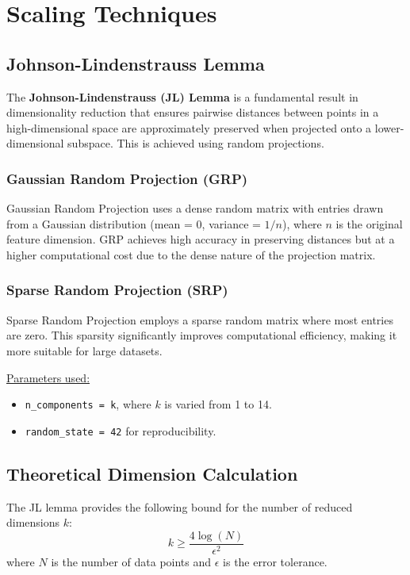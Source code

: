 \documentclass[conference]{IEEEtran}
\begin{document}
\section{Scaling Techniques}

\subsection{Johnson-Lindenstrauss Lemma}
The \textbf{Johnson-Lindenstrauss (JL) Lemma} is a fundamental result in dimensionality reduction that ensures pairwise distances between points in a high-dimensional space are approximately preserved when projected onto a lower-dimensional subspace. This is achieved using random projections.

\subsubsection{\textbf{Gaussian Random Projection (GRP)}}
Gaussian Random Projection uses a dense random matrix with entries drawn from a Gaussian distribution (mean = 0, variance = \(1/n\)), where \(n\) is the original feature dimension. GRP achieves high accuracy in preserving distances but at a higher computational cost due to the dense nature of the projection matrix.

\subsubsection{\textbf{Sparse Random Projection (SRP)}}
Sparse Random Projection employs a sparse random matrix where most entries are zero. This sparsity significantly improves computational efficiency, making it more suitable for large datasets.

\underline{Parameters used:}
\begin{itemize}
    \item \texttt{n\_components = k}, where \(k\) is varied from 1 to 14.
    \item \texttt{random\_state = 42} for reproducibility.
\end{itemize}

\subsection{Theoretical Dimension Calculation}
The JL lemma provides the following bound for the number of reduced dimensions \(k\):
\[
k \geq \frac{4 \log(N)}{\epsilon^2}
\]
where \(N\) is the number of data points and \(\epsilon\) is the error tolerance.
\end{document}
